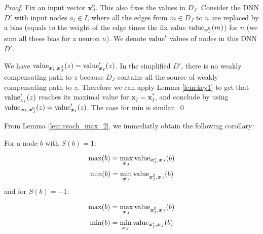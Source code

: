 			\begin{proof}	
				Fix an input vector $\boldsymbol{x}^0_J$.
				This also fixes the values in $D_J$.
				Consider the DNN $D'$ with input nodes $a_i\in I$, where all the 
				edges from $m \in D_J$ to $n$ are replaced by a bias (equals to the weight of the edge times the fix value ${\textrm{value}}_{\boldsymbol{x}^0_J}(m)$) for $n$ (we sum all these bias for a neuron $n$).
				We denote ${\textrm{value}}'$ values of nodes in this DNN $D'$.
				 
				We have ${\textrm{value}}_{\boldsymbol{x}_I,\boldsymbol{x}^0_J}(z) = {\textrm{value}}'_{\boldsymbol{x}_I}(z)$.
				In the simplified $D'$, there is no weakly compensating path to $z$ because 
				$D_J$ contains all the source of weakly compensating path to $z$.
				Therefore we can apply Lemma \ref{lem:key1} to get that 
				${\textrm{value}}'_{x_I}(z)$ reaches its maximal value for $\boldsymbol{x}_I=\boldsymbol{x}_I^*$, and conclude by using ${\textrm{value}}_{\boldsymbol{x}_I,\boldsymbol{x}^0_J}(z) = {\textrm{value}}'_{\boldsymbol{x}_I}(z)$. The case for min is similar. \qed
			\end{proof}
			
			From Lemma \ref{lem:reach_max_2}, we immediatly obtain the following corollary:

			\begin{corollary}
				\label{corr:main}
			For a node $b$ with $S(b)=1$:
		
			$$\max(b)=\max_{\boldsymbol{x}_J} {\textrm{value}}_{\boldsymbol{x}^{\star}_I,\boldsymbol{x}_J}(b)$$
			$$\min(b)=\min_{\boldsymbol{x}_J} {\textrm{value}}_{\boldsymbol{x}^{\sharp}_I,\boldsymbol{x}_J}(b)$$
			and for $S(b)=-1$:
	
			$$\max(b)=\max_{\boldsymbol{x}_J} {\textrm{value}}_{\boldsymbol{x}^{\sharp}_I,\boldsymbol{x}_J}(b)$$
			$$\min(b)=\min_{\boldsymbol{x}_J} {\textrm{value}}_{\boldsymbol{x}^{\star}_I,\boldsymbol{x}_J}(b)$$
			\end{corollary}
			
	
			


			
			





			
			
			
